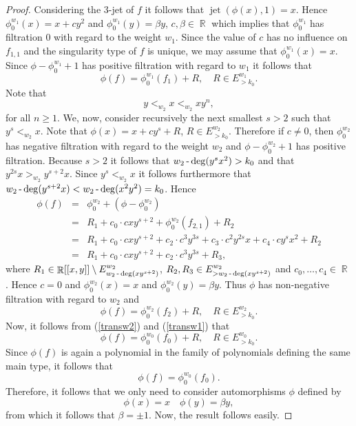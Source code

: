 \documentclass[noend]{amsproc}
\theoremstyle{definition}
\DeclareMathOperator{\jet}{jet}
\DeclareMathOperator{\R}{\mathbb{R}}
\DeclareMathOperator{\dash}{\textnormal{-}}
\begin{document}
\begin{proof}
Considering the $3$-jet of $f$ it follows that $\jet(\phi(x),1)=x$. Hence $\phi_0^{w_1}(x)=x+cy^2$ and $\phi_0^{w_1}(y)=\beta y$, $c,\beta\in\R$ which implies that $\phi^{w_1}_0$ has filtration $0$ with regard to the weight $w_1$. Since the value of $c$ has no influence on $f_{1,1}$ and the singularity type of $f$ is unique, we may assume that $\phi_0^{w_1}(x)=x$. Since $\phi-\phi_0^{w_1}+1$ has positive filtration with regard to $w_1$ it follows that 
\begin{equation}\label{transw2}
\phi(f) = \phi_0^{w_1}(f_1) + R,\quad R\in E^{w_1}_{>k_0}.
\end{equation}
Note that 
\begin{equation}\label{orderw1}
y<_{w_2}x<_{w_2}xy^n,
\end{equation}
for all $n\ge 1$. We, now, consider recursively the next smallest $s>2$ such that $y^s<_{w_2}x$. Note that $\phi(x)=x+cy^s+R$, $R\in E^{w_2}_{>k_0}$. Therefore if $c\neq 0$, then $\phi_0^{w_2}$ has negative filtration with regard to the weight $w_2$ and $\phi-\phi_0^{w_2}+1$ has positive filtration. Because $s>2$ it follows that $w_2\dash\deg(y^sx^2)>k_0$ and that $y^{2s}x>_{w_2}y^{s+2}x$. Since $y^s<_{w_2}x$ it follows furthermore that $w_2\dash\deg(y^{s+2}x)<w_2\dash\deg(x^2y^2)=k_0$. Hence
\begin{eqnarray*}
\phi(f) &=& \phi_0^{w_2}+(\phi-\phi_0^{w_2})\\
 &=&  R_1+c_0\cdot c xy^{s+2}+\phi_0^{w_2}(f_{2,1})+R_2\\
&=&R_1+c_0\cdot c xy^{s+2}+ c_2\cdot c^3y^{3s}+c_3\cdot c^2y^{2s}x+c_4\cdot cy^sx^2+R_2\\
&=&R_1+c_0\cdot c xy^{s+2}+ c_2\cdot c^3y^{3s}+R_3,
\end{eqnarray*}
where $R_1\in\R[[x,y]]\setminus E^{w_2}_{w_2\dash\deg(xy^{s+2})}$, $R_2, R_3\in E^{w_2}_{>w_2\dash\deg(xy^{s+2})}$ and $c_0,\ldots,c_4\in\R$. Hence $c=0$ and $\phi_0^{w_2}(x)=x$ and $\phi_0^{w_2}(y)=\beta y$. Thus $\phi$ has non-negative filtration with regard to $w_2$ and
\begin{equation}\label{transw1}
\phi(f) = \phi_0^{w_2}(f_2)+R,\quad R\in E^{w_2}_{>k_0}.
\end{equation}
Now, it follows from (\ref{transw2}) and (\ref{transw1}) that 
\begin{equation*}
\phi(f) = \phi_0^{w_0}(f_0)+R,\quad R\in E^{w_0}_{>k_0}.
\end{equation*}
Since $\phi(f)$ is again a polynomial in the family of polynomials defining the same main type, it follows that
\begin{equation*}
\phi(f) = \phi_0^{w_0}(f_0).
\end{equation*}
Therefore, it follows that we only need to consider automorphisms $\phi$ defined by
\[\phi(x)=x\quad \phi(y)=\beta y,\]
from which it follows that $\beta=\pm 1$. Now, the result follows easily.
\end{proof}
\newpage
\end{document}
